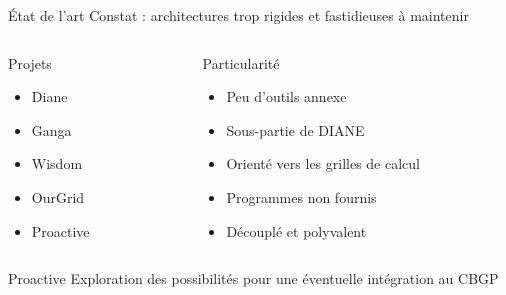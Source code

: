 \documentclass[handout]{beamer}
\begin{document}
\begin{frame}{État de l'art}
    Constat : architectures trop rigides et fastidieuses à maintenir
	\begin{columns}
	\begin{column}[l]{0.3\linewidth}
    \begin{block}{Projets}
        \begin{itemize}
            \item<2-> Diane
            \item<3-> Ganga
            \item<4-> Wisdom
            \item<5-> OurGrid
            \item<6-> Proactive
        \end{itemize}
    \end{block}
	\end{column}
	\begin{column}[r]{0.6\linewidth}
    \begin{exampleblock}{Particularité}
        \begin{itemize}
            \item<2-> Peu d'outils annexe
            \item<3-> Sous-partie de DIANE
            \item<4-> Orienté vers les grilles de calcul
            \item<5-> Programmes non fournis
            \item<6-> Découplé et polyvalent
        \end{itemize}
    \end{exampleblock}
	\end{column}
	\end{columns}
\end{frame}

\begin{frame}{Proactive}
    Exploration des possibilités pour une éventuelle intégration au CBGP
\end{frame}
\end{document}
